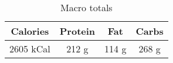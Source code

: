 \documentclass{report}
\begin{document}
\begin{multicols}{2}
\begin{enumerate}
\begin{table}[H]
  \begin{center}
    \caption{Macro totals}
    \label{tab:table1}
    \begin{tabular}{c|c|c|c} %
      \textbf{Calories} & \textbf{Protein} & \textbf{Fat} & \textbf{Carbs}\\
      \hline
      2605 kCal & 212 g & 114 g & 268 g\\
    \end{tabular}
  \end{center}
\end{table}
 
\end{enumerate}
\end{multicols}




\end{document}
